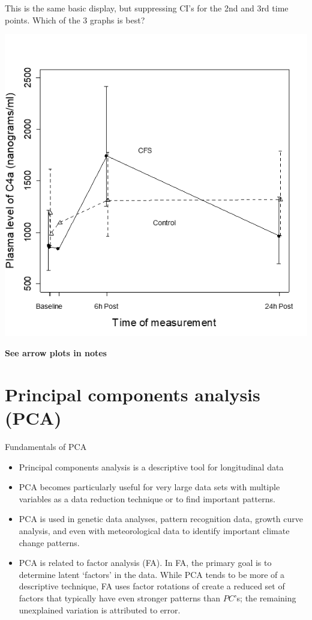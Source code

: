 \documentclass[
  9pt,
  ignorenonframetext,
]{beamer}
\providecommand{\tightlist}{%
  \setlength{\itemsep}{0pt}\setlength{\parskip}{0pt}}
\begin{document}
\begin{frame}{}
\protect\hypertarget{section-8}{}
This is the same basic display, but suppressing CI's for the 2nd and 3rd
time points. Which of the 3 graphs is best?

\tiny

\begin{center}\includegraphics[width=0.6\linewidth]{figs_L2/L2-f15} \end{center}

\tiny

\textbf{See arrow plots in notes}
\end{frame}

\hypertarget{principal-components-analysis-pca}{%
\section{Principal components analysis
(PCA)}\label{principal-components-analysis-pca}}

\begin{frame}{Fundamentals of PCA}
\protect\hypertarget{fundamentals-of-pca}{}
\begin{itemize}
\tightlist
\item
  Principal components analysis is a descriptive tool for longitudinal
  data
\item
  PCA becomes particularly useful for very large data sets with multiple
  variables as a data reduction technique or to find important patterns.
\item
  PCA is used in genetic data analyses, pattern recognition data, growth
  curve analysis, and even with meteorological data to identify
  important climate change patterns.
\item
  PCA is related to factor analysis (FA). In FA, the primary goal is to
  determine latent `factors' in the data. While PCA tends to be more of
  a descriptive technique, FA uses factor rotations of create a reduced
  set of factors that typically have even stronger patterns than
  \(PC\)'s; the remaining unexplained variation is attributed to error.
\end{itemize}
\end{frame}
\end{document}
